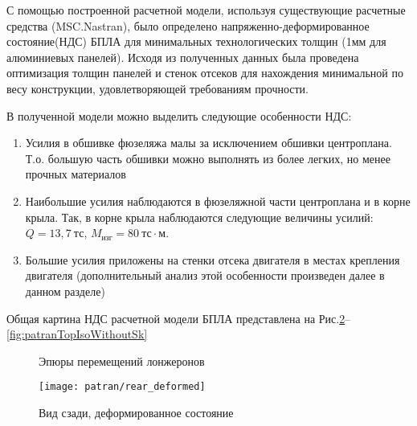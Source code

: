 
С помощью построенной расчетной модели, используя существующие расчетные средства (MSC.Nastran), было определено напряженно-деформированное состояние(НДС) БПЛА для минимальных технологических толщин (1мм для алюминиевых панелей). Исходя из полученных данных была проведена оптимизация толщин панелей и стенок отсеков для нахождения минимальной по весу конструкции, удовлетворяющей требованиям прочности.

В полученной модели можно выделить следующие особенности НДС:

\begin{enumerate}
\item Усилия в обшивке фюзеляжа малы за исключением обшивки центроплана. Т.о. большую часть обшивки можно выполнять из более легких, но менее прочных материалов
\item Наибольшие усилия наблюдаются в фюзеляжной части центроплана и в корне крыла. Так, в корне крыла наблюдаются следующие величины усилий: $Q = 13,7~\text{тс}$, $M_\text{изг} = 80~\text{тс}\cdot\text{м}$. 
\item Большие усилия приложены на стенки отсека двигателя в местах крепления двигателя (дополнительный анализ этой особенности произведен далее в данном разделе)
\end{enumerate}  

Общая картина НДС расчетной модели БПЛА представлена на Рис.\ref{fig:patranRearDeformed}--\ref{fig:patranTopIsoWithoutSk}


%



\begin{figure}[H]
\centering
\def\svgwidth{0.9\textwidth}

\caption{Эпюры перемещений лонжеронов}
\label{fig:WingDeformation3}
\end{figure}

\begin{figure}[H]
\centering
\texttt{[image: patran/rear\_deformed]}
\caption{Вид сзади, деформированное состояние}
\label{fig:patranRearDeformed}
\end{figure}


